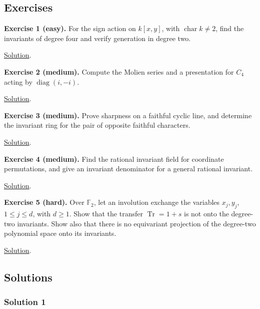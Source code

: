 \documentclass[
]{article}
\begin{document}
\subsection{Exercises}\label{exercises}

\protect{}\label{exercise-1}{}

\textbf{Exercise 1 (easy).} For the sign action on \(k [x,y]\), with
\(\operatorname{char}k\ne2\), find the invariants of degree four and
verify generation in degree two.

\hyperref[solution-1]{Solution}.

\protect{}\label{exercise-2}{}

\textbf{Exercise 2 (medium).} Compute the Molien series and a
presentation for \(C_4\) acting by \(\operatorname{diag}(i,-i)\).

\hyperref[solution-2]{Solution}.

\protect{}\label{exercise-3}{}

\textbf{Exercise 3 (medium).} Prove sharpness on a faithful cyclic line,
and determine the invariant ring for the pair of opposite faithful
characters.

\hyperref[solution-3]{Solution}.

\protect{}\label{exercise-4}{}

\textbf{Exercise 4 (medium).} Find the rational invariant field for
coordinate permutations, and give an invariant denominator for a general
rational invariant.

\hyperref[solution-4]{Solution}.

\protect{}\label{exercise-5}{}

\textbf{Exercise 5 (hard).} Over \(\mathbb F_2\), let an involution
exchange the variables \(x_j,y_j\), \(1\leq j\leq d\), with \(d\geq1\).
Show that the transfer \(\operatorname{Tr}=1+s\) is not onto the
degree-two invariants. Show also that there is no equivariant projection
of the degree-two polynomial space onto its invariants.

\hyperref[solution-5]{Solution}.

\subsection{Solutions}\label{solutions}

\subsubsection{Solution 1}\label{solution-1}
\end{document}
